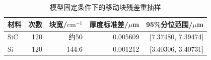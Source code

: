 \begin{table}[htbp]\centering
\caption{模型固定条件下的移动块残差重抽样}\label{tab:bootstrap}
\begin{tabular}{lrrrr}
\toprule
材料 & 次数 & 块宽/$\mathrm{cm}^{-1}$ & 厚度标准差/$\mu$m & 95\%分位范围/$\mu$m\\\midrule
SiC & 120 & 约50 & 0.005609 & [7.37480, 7.39474]\\
Si & 120 & 144.6 & 0.001212 & [3.40306, 3.40731]\\
\bottomrule
\end{tabular}\end{table}
